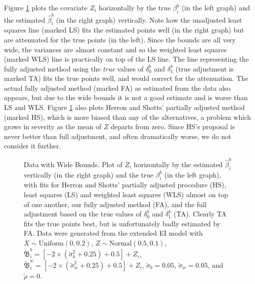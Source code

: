 \documentclass[11pt,titlepage]{article}
\newcommand{\bbeta}{{\mathfrak B}}
\newcommand{\sigmau}{\breve{\sigma}}
\newcommand{\rhou}{\breve{\rho}}
\begin{document}
Figure \ref{f:wide} plots the covariate $Z_i$ horizontally by the true
$\beta_i^b$ (in the left graph) and the estimated $\hat\beta_i^b$ (in
the right graph) vertically.  Note how the unadjusted least squares
line (marked LS) fits the estimated points well (in the right graph)
but are attenuated for the true points (in the left).  Since the
bounds are all very wide, the variances are almost constant and so the
weighted least squares (marked WLS) line is practically on top of the
LS line.  The line representing the fully adjusted method using the
\emph{true} values of $\delta_0^b$ and $\delta_1^b$ (true adjustment is
marked TA) fits the true points well, and would correct for the
attenuation.  The actual fully adjusted method (marked FA) as
estimated from the data also appears, but due to the wide bounds it is
not a good estimate and is worse than LS and WLS.  Figure \ref{f:wide}
also plots Herron and Shotts' partially adjusted method (marked HS),
which is more biased than any of the alternatives, a problem which
grows in severity as the mean of $Z$ departs from zero.  Since HS's
proposal is never better than full adjustment, and often dramatically
worse, we do not consider it further.
\begin{figure}[t]
  \begin{center}
    \caption{Data with Wide Bounds. Plot of $Z_i$ horizontally by
      the estimated $\hat\beta_i^b$ vertically (in the right graph)
      and the true $\beta_i^b$ (in the left graph), with fits for
      Herron and Shotts' partially adjusted procedure (HS), least
      squares (LS) and weighted least squares (WLS) almost on top of
      one another, our fully adjusted method (FA), and the full
      adjustment based on the true values of $\delta_0^b$ and $\delta_1^b$
      (TA).  Clearly TA fits the true points best, but is
      unfortunately badly estimated by FA.  Data were generated from
      the extended EI model with $X \sim \textrm{Uniform}(0,0.2)$, $Z
      \sim \textrm{Normal}(0.5,0.1)$, $\breve\bbeta_i^b = [-2 \times
      (\sigmau_b^2 + 0.25) + 0.5] + Z_i$, $\breve\bbeta_i^w = [-2
      \times (\sigmau_w^2 + 0.25) + 0.5] + Z_i$, $\sigmau_b = 0.05$,
      $\sigmau_w = 0.05$, and $\rhou = 0$.}
    \label{f:wide}
  \end{center}
\end{figure}
\end{document}
